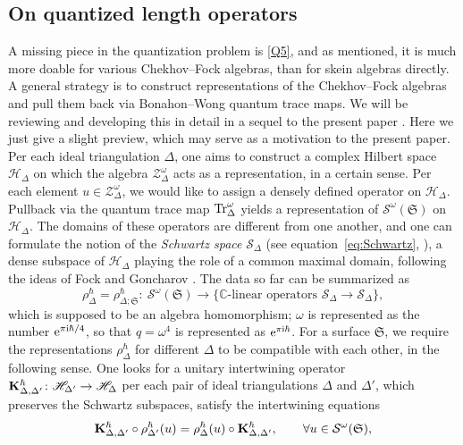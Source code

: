 \documentclass[10pt,a4paper]{amsart}
\numberwithin{equation}{section}
\theoremstyle{definition}
\begin{document}
\subsection{On quantized length operators}
\label{subsec:on_quantized_length_operators}
A missing piece in the quantization problem is \ref{Q5}, and as mentioned, it is much more doable for various Chekhov--Fock algebras, than for skein algebras directly. A general strategy is to construct representations of the Chekhov--Fock algebras and pull them back via Bonahon--Wong quantum trace maps. We will be reviewing and developing this in detail in a sequel to the present paper \cite{sequel}. Here we just give a slight preview, which may serve as a motivation to the present paper. Per each ideal triangulation $\Delta$, one aims to construct a complex Hilbert space $\mathscr{H}_\Delta$ on which the algebra $\mathcal{Z}^\omega_\Delta$ acts as a representation, in a certain sense. Per each element $u \in \mathcal{Z}^\omega_\Delta$, we would like to assign a densely defined operator on $\mathscr{H}_\Delta$. Pullback via the quantum trace map ${\rm Tr}^\omega_\Delta$ yields a representation of $\mathcal{S}^\omega(\mathfrak{S})$ on $\mathscr{H}_\Delta$. The domains of these operators are different from one another, and one can formulate the notion of the {\it Schwartz space} $\mathscr{S}_\Delta$ (see equation~\eqref{eq:Schwartz}, \cite[Definition~5.2]{FG09}), a dense subspace of $\mathscr{H}_\Delta$ playing the role of a common maximal domain, following the ideas of Fock and Goncharov \cite{FG09}. The data so far can be summarized as
\[
\rho^\hbar_\Delta = \rho^\hbar_{\Delta;\mathfrak{S}} \colon \ \mathcal{S}^\omega(\mathfrak{S}) \to \{\mbox{$\mathbb{C}$-linear operators $\mathscr{S}_\Delta \to \mathscr{S}_\Delta$}\},
\]
which is supposed to be an algebra homomorphism; $\omega$ is represented as the number ${\rm e}^{\pi {\rm i} \hbar/4}$, so that $q=\omega^4$ is represented as ${\rm e}^{\pi {\rm i} \hbar}$. For a surface $\mathfrak{S}$, we require the representations $\rho^\hbar_\Delta$ for different $\Delta$ to be compatible with each other, in the following sense. One looks for a unitary intertwining operator ${\bf K}^\hbar_{\Delta,\Delta'} \colon \mathscr{H}_{\Delta'} \to \mathscr{H}_\Delta$ per each pair of ideal triangulations $\Delta$ and $\Delta'$, which preserves the Schwartz subspaces, satisfy the intertwining equations
\[
{\bf K}^\hbar_{\Delta,\Delta'} \circ \rho^\hbar_{\Delta'}(u) = \rho^\hbar_\Delta(u) \circ {\bf K}^\hbar_{\Delta,\Delta'}, \qquad \forall u \in \mathcal{S}^\omega(\mathfrak{S}),
\]
\end{document}
